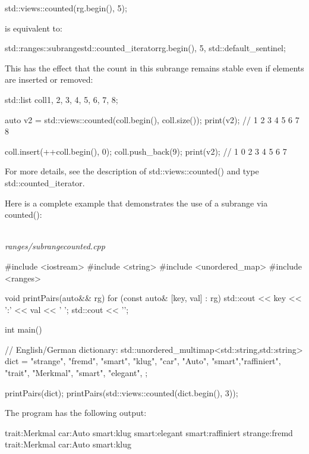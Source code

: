 \begin{cpp}
std::views::counted(rg.begin(), 5);
\end{cpp}

is equivalent to:


\begin{cpp}
std::ranges::subrange{std::counted_iterator{rg.begin(), 5},
	std::default_sentinel};
\end{cpp}

This has the effect that the count in this subrange remains stable even if elements are inserted or removed:

\begin{cpp}
std::list coll{1, 2, 3, 4, 5, 6, 7, 8};

auto v2 = std::views::counted(coll.begin(), coll.size());
print(v2); // 1 2 3 4 5 6 7 8

coll.insert(++coll.begin(), 0);
coll.push_back(9);
print(v2); // 1 0 2 3 4 5 6 7
\end{cpp}

For more details, see the description of std::views::counted() and type std::counted\_iterator.

Here is a complete example that demonstrates the use of a subrange via counted():

\noindent
\hspace*{\fill} \\ %
\textit{ranges/subrangecounted.cpp}

\begin{cpp}
#include <iostream>
#include <string>
#include <unordered_map>
#include <ranges>

void printPairs(auto&& rg)
{
	for (const auto& [key, val] : rg) {
		std::cout << key << ':' << val << ' ';
	}
	std::cout << '\n';
}

int main()
{
	// English/German dictionary:
	std::unordered_multimap<std::string,std::string> dict = {
		{"strange", "fremd"},
		{"smart", "klug"},
		{"car", "Auto"},
		{"smart","raffiniert"},
		{"trait", "Merkmal"},
		{"smart", "elegant"},
	};
	
	printPairs(dict);
	printPairs(std::views::counted(dict.begin(), 3));
}
\end{cpp}

The program has the following output:

{\footnotesize
\begin{shell}
trait:Merkmal car:Auto smart:klug smart:elegant smart:raffiniert strange:fremd
trait:Merkmal car:Auto smart:klug
\end{shell}
}

